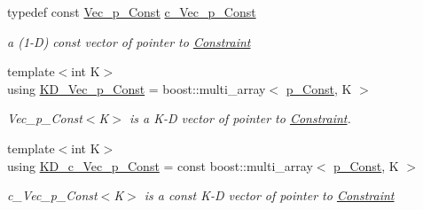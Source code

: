\begin{DoxyCompactItemize}
\mbox{\label{group___constraint___t_y_p_e_s_gad943734c94d1d3646f49c94dcf3916b5}} 
typedef const \mbox{\hyperlink{group___constraint___t_y_p_e_s_ga4ce7980e39e7cfce6c532e9475fb5001}{Vec\+\_\+p\+\_\+\+Const}} \mbox{\hyperlink{group___constraint___t_y_p_e_s_gad943734c94d1d3646f49c94dcf3916b5}{c\+\_\+\+Vec\+\_\+p\+\_\+\+Const}}
\begin{DoxyCompactList}\small\item\em a (1-\/D) const vector of pointer to \mbox{\hyperlink{class_s_m_spp__di__unipi__it_1_1_constraint}{Constraint}} \end{DoxyCompactList}\item 
\mbox{\label{group___constraint___t_y_p_e_s_gad29c159d9cb59d8165cddf1656b987f0}} 
{\footnotesize template$<$int K$>$ }\\using \mbox{\hyperlink{group___constraint___t_y_p_e_s_gad29c159d9cb59d8165cddf1656b987f0}{K\+D\+\_\+\+Vec\+\_\+p\+\_\+\+Const}} = boost\+::multi\+\_\+array$<$ \mbox{\hyperlink{group___constraint___t_y_p_e_s_gae2abae1fd3e9370e1c0cc9dfbb4d6718}{p\+\_\+\+Const}}, K $>$
\begin{DoxyCompactList}\small\item\em Vec\+\_\+p\+\_\+\+Const$<$\+K$>$ is a K-\/D vector of pointer to \mbox{\hyperlink{class_s_m_spp__di__unipi__it_1_1_constraint}{Constraint}}. \end{DoxyCompactList}\item 
\mbox{\label{group___constraint___t_y_p_e_s_ga3512a46189a9cd213323d9e9c5c083e1}} 
{\footnotesize template$<$int K$>$ }\\using \mbox{\hyperlink{group___constraint___t_y_p_e_s_ga3512a46189a9cd213323d9e9c5c083e1}{K\+D\+\_\+c\+\_\+\+Vec\+\_\+p\+\_\+\+Const}} = const boost\+::multi\+\_\+array$<$ \mbox{\hyperlink{group___constraint___t_y_p_e_s_gae2abae1fd3e9370e1c0cc9dfbb4d6718}{p\+\_\+\+Const}}, K $>$
\begin{DoxyCompactList}\small\item\em c\+\_\+\+Vec\+\_\+p\+\_\+\+Const$<$\+K$>$ is a const K-\/D vector of pointer to \mbox{\hyperlink{class_s_m_spp__di__unipi__it_1_1_constraint}{Constraint}} \end{DoxyCompactList}\item 
\mbox{\label{group___constraint___t_y_p_e_s_gaa56320d40c626389a8a4ce4b5a4fb0a8}} 

\end{DoxyCompactItemize}
